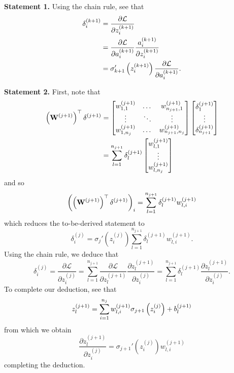\documentclass[11pt]{article}
\begin{document}
\vspace{10pt}
\noindent\textbf{Statement 1.} Using the chain rule, see that
\begin{align*}
    \delta_i^{(k+1)}
    &=
    \frac{\partial\mathcal{L}}{\partial z_i^{(k+1)}}\\
    &=
    \frac{\partial\mathcal{L}}{\partial a_i^{(k+1)}}\frac{a_i^{(k+1)}}{\partial z_i^{(k+1)}}\\
    &=
    \sigma_{k+1}'\left(z_i^{(k+1)}\right)\frac{\partial\mathcal{L}}{\partial a_i^{(k+1)}}.
\end{align*}

\noindent\textbf{Statement 2.} First, note that
\begin{align*}
    \left(\mathbf{W}^{(j+1)}\right)^\top\delta^{(j+1)}
    &=
    \begin{bmatrix}
        w_{1,1}^{(j+1)}   & \dots  & w_{n_{j+1},1}^{(j+1)}\\
        \vdots            & \ddots & \vdots               \\
        w_{1,n_j}^{(j+1)} & \dots  & w_{n_{j+1},n_j}^{(j+1)}
    \end{bmatrix}
    \begin{bmatrix}
        \delta_1^{(j+1)}\\
        \vdots\\
        \delta_{n_{j+1}}^{(j+1)}
    \end{bmatrix}\\
    &=
    \sum_{l=1}^{n_{j+1}}\delta_l^{(j+1)}
    \begin{bmatrix}
        w_{l,1}^{(j+1)}\\
        \vdots\\
        w_{l,n_j}^{(j+1)}
    \end{bmatrix}
\end{align*}
and so
$$
\left(\left(\mathbf{W}^{(j+1)}\right)^\top\delta^{(j+1)}\right)_i
=
\sum_{l=1}^{n_{j+1}}\delta_l^{(j+1)}w_{l,i}^{(j+1)}
$$
which reduces the to-be-derived statement to
$$
\delta_i^{(j)}
=
\sigma_j'(z_i^{(j)})\sum_{l=1}^{n_{j+1}}\delta_l^{(j+1)}w_{l,i}^{(j+1)}.
$$
Using the chain rule, we deduce that
\begin{equation*}
    \label{eq:back_prop_statement_2}
    \delta_i^{(j)}
    =
    \frac{\partial\mathcal{L}}{\partial z_i^{(j)}}
    =
    \sum_{l=1}^{n_{j+1}}\frac{\partial\mathcal{L}}{\partial z_l^{(j+1)}}\frac{\partial z_l^{(j+1)}}{\partial z_i^{(j)}}
    =
    \sum_{l=1}^{n_{j+1}}\delta_l^{(j+1)}\frac{\partial z_l^{(j+1)}}{\partial z_i^{(j)}}.
\end{equation*}
To complete our deduction, see that
$$
z_l^{(j+1)}
=
\sum_{i=1}^{n_j}w_{l,i}^{(j+1)}\sigma_{j+1}\left(z_i^{(j)}\right)+b_l^{(j+1)}
$$
from which we obtain
$$
\frac{\partial z_l^{(j+1)}}{\partial z_i^{(j)}}
=
\sigma_{j+1}'(z_i^{(j)})w_{l,i}^{(j+1)}
$$
completing the deduction.
\end{document}
